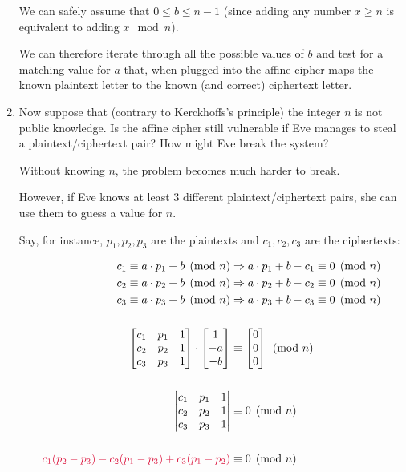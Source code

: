 \begin{problem}
\begin{enumerate}
\begin{Answer}
\noindent
We can safely assume that $0 \le b \le n-1$ 
(since adding any number $x \ge n$ is equivalent to adding
$x \mod n$).

\noindent
We can therefore iterate through all the possible values of $b$ and
test for a matching value for $a$ that, when plugged into the affine cipher
maps the known plaintext letter to the known (and correct) ciphertext letter.

\end{Answer}
\item Now suppose that (contrary to Kerckhoffs's principle) the integer $n$ is not public knowledge.
Is the affine cipher still vulnerable if Eve manages to steal a plaintext/ciphertext pair?
How might Eve break the system?
\begin{Answer}
  
Without knowing $n$, the problem becomes much harder to break.

\noindent
However, if Eve knows at least $3$ different plaintext/ciphertext pairs,
she can use them to guess a value for $n$.

Say, for instance, $p_1, p_2, p_3$ are the plaintexts and $c_1, c_2, c_3$ are the ciphertexts:

\begin{align*}
  c_1 \equiv a \cdot p_1 + b \pmod n &\Rightarrow a \cdot p_1 + b - c_1 \equiv 0 \pmod n\\
  c_2 \equiv a \cdot p_2 + b \pmod n &\Rightarrow a \cdot p_2 + b - c_2 \equiv 0 \pmod n\\
  c_3 \equiv a \cdot p_3 + b \pmod n &\Rightarrow a \cdot p_3 + b - c_3 \equiv 0 \pmod n\\
  \\
  \begin{bmatrix}
    c_1 & p_1 & 1\\
    c_2 & p_2 & 1\\
    c_3 & p_3 & 1
  \end{bmatrix} \cdot \begin{bmatrix}
    1\\
    -a\\
    -b
  \end{bmatrix} &\equiv \begin{bmatrix}
    0\\
    0\\
    0
  \end{bmatrix} \pmod n\\
  \\
  \begin{vmatrix}
    c_1 & p_1 & 1\\
    c_2 & p_2 & 1\\
    c_3 & p_3 & 1
  \end{vmatrix} &\equiv 0 \pmod n\\
  \\
  \color{crimson}
  c_1(p_2-p_3) - c_2(p_1-p_3) + c_3(p_1 - p_2) &\equiv 0 \pmod n \\
  \color{black} \\
\end{align*}


\end{Answer}
\end{enumerate}
\end{problem}
